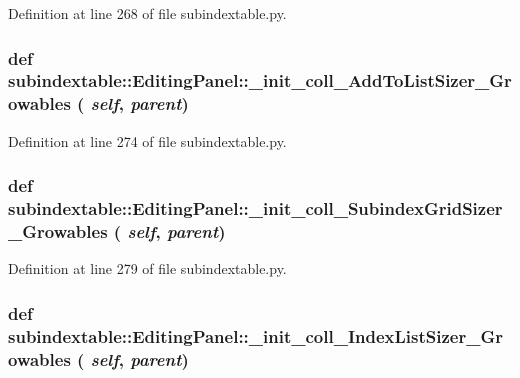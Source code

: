 Definition at line 268 of file subindextable.py.\hypertarget{classsubindextable_1_1EditingPanel_266b256cfd896e3a42c23f531de93121}{
\subsubsection[\_\-init\_\-coll\_\-AddToListSizer\_\-Growables]{\setlength{\rightskip}{0pt plus 5cm}def subindextable::Editing\-Panel::\_\-init\_\-coll\_\-Add\-To\-List\-Sizer\_\-Growables ( {\em self},  {\em parent})}}
\label{classsubindextable_1_1EditingPanel_266b256cfd896e3a42c23f531de93121}




Definition at line 274 of file subindextable.py.\hypertarget{classsubindextable_1_1EditingPanel_79c7c994481b15c024ba65a5cab5185d}{
\subsubsection[\_\-init\_\-coll\_\-SubindexGridSizer\_\-Growables]{\setlength{\rightskip}{0pt plus 5cm}def subindextable::Editing\-Panel::\_\-init\_\-coll\_\-Subindex\-Grid\-Sizer\_\-Growables ( {\em self},  {\em parent})}}
\label{classsubindextable_1_1EditingPanel_79c7c994481b15c024ba65a5cab5185d}




Definition at line 279 of file subindextable.py.\hypertarget{classsubindextable_1_1EditingPanel_59497a2a5eae0d061db737c27b459ede}{
\subsubsection[\_\-init\_\-coll\_\-IndexListSizer\_\-Growables]{\setlength{\rightskip}{0pt plus 5cm}def subindextable::Editing\-Panel::\_\-init\_\-coll\_\-Index\-List\-Sizer\_\-Growables ( {\em self},  {\em parent})}}
\label{classsubindextable_1_1EditingPanel_59497a2a5eae0d061db737c27b459ede}




